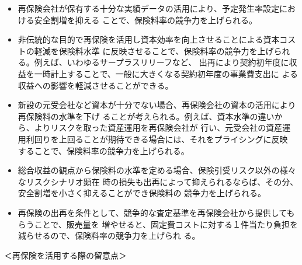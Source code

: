 \documentclass[report,gutter=10mm,fore-edge=10mm,uplatex,dvipdfmx]{jlreq}
\begin{document}
\begin{itemize}
\item[] 再保険会社が保有する十分な実績データの活用により、予定発生率設定における安全割増を抑える
ことで、保険料率の競争力を上げられる。
\item[] 非伝統的な目的で再保険を活用し資本効率を向上させることによる資本コストの軽減を保険料水準
に反映させることで、保険料率の競争力を上げられる。例えば、いわゆるサープラスリリーフなど、
出再により契約初年度に収益を一時計上することで、一般に大きくなる契約初年度の事業費支出に
よる収益への影響を軽減させることができる。
\item[] 新設の元受会社など資本が十分でない場合、再保険会社の資本の活用により再保険料の水準を下げ
ることが考えられる。例えば、資本水準の違いから、よりリスクを取った資産運用を再保険会社が
行い、元受会社の資産運用利回りを上回ることが期待できる場合には、それをプライシングに反映
することで、保険料率の競争力を上げられる。
\item[] 総合収益の観点から保険料の水準を定める場合、保険引受リスク以外の様々なリスクシナリオ顕在
時の損失も出再によって抑えられるならば、その分、安全割増を小さく抑えることができ保険料の
競争力を上げられる。
\item[] 再保険の出再を条件として、競争的な査定基準を再保険会社から提供してもらうことで、販売量を
増やせると、固定費コストに対する１件当たり負担を減らせるので、保険料率の競争力を上げられ
る。
\end{itemize}

＜再保険を活用する際の留意点＞
\end{document}
